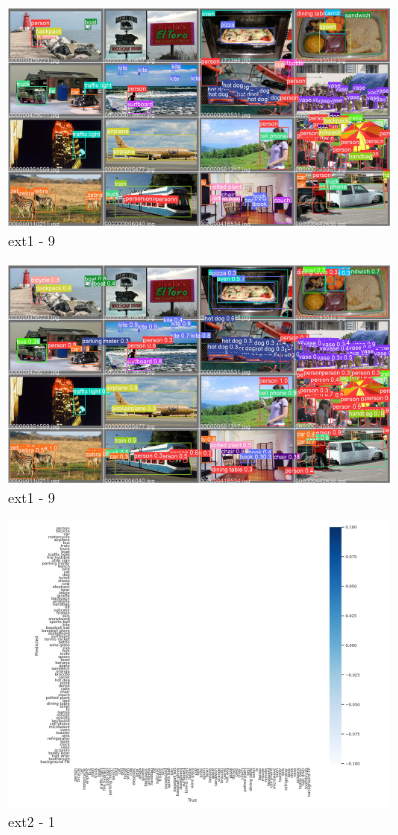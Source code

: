 \documentclass[10pt,UTF8]{ctexart}
\begin{document}
\begin{figure}[H]
\centering 
\includegraphics[width=0.90\textwidth]{ex110.jpg} 
\caption{ext1 - 9}
\label{Test}
\end{figure}

\begin{figure}[H]
\centering 
\includegraphics[width=0.90\textwidth]{ex111.jpg} 
\caption{ext1 - 9}
\label{Test}
\end{figure}

\begin{figure}[H]
\centering 
\includegraphics[width=0.90\textwidth]{ex21.png} 
\caption{ext2 - 1}
\label{Test}
\end{figure}
\end{document}

